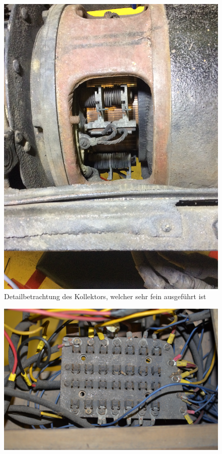 \begin{landscape}
\begin{figure}[h]
		\includegraphics[angle=180,width=1.30\textwidth]{images/Anhang/Kollektor.jpg}
	\caption{Detailbetrachtung des Kollektors, welcher sehr fein ausgeführt ist}
	\label{fig:Kollektor_Anhang}
\end{figure}
\begin{figure}[h]
	\centering
		\includegraphics[width=1.30\textwidth]{images/Anhang/Sicherungsbrett_Beleuchtung.jpg}

\end{figure}
\end{landscape}
